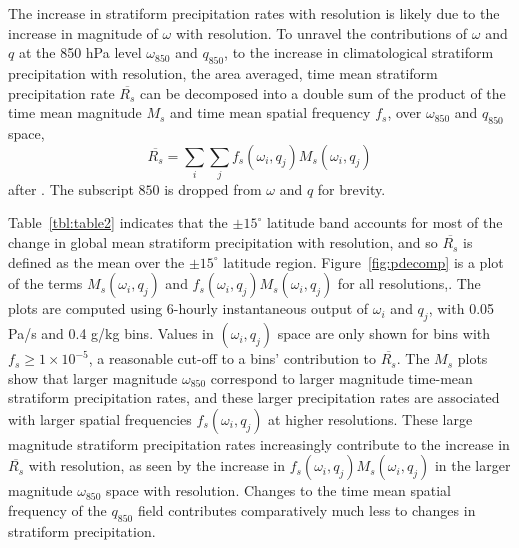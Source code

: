 \documentclass[times]{qjrms4}
\begin{document}
The increase in stratiform precipitation rates with resolution is likely due to the increase in magnitude of $\omega$ with resolution. To unravel the contributions of $\omega$ and $q$ at the 850 hPa level $\omega_{850}$ and $q_{850}$, to the increase in climatological stratiform precipitation with resolution, the area averaged, time mean stratiform precipitation rate $\overline{R_{s}}$ can be decomposed into a double sum of the product of the time mean magnitude $M_s$ and time mean spatial frequency $f_s$, over $\omega_{850}$ and $q_{850}$ space,
\begin{equation}
\overline{R_{s}} = \sum_i \sum_j f_s \left( \omega_i , q_j \right) M_s \left( \omega_i , q_j \right) \label{eq:pdecomp}
\end{equation}
after \cite{TETAL2018CD}. The subscript $850$ is dropped from $\omega$ and $q$ for brevity. 

Table~\ref{tbl:table2} indicates that the $\pm 15^{\circ}$ latitude band accounts for most of the change in global mean stratiform precipitation with resolution, and so $\overline{R_s}$ is defined as the mean over the $\pm 15^{\circ}$ latitude region. Figure~\ref{fig:pdecomp} is a plot of the terms $M_s \left( \omega_i , q_j \right)$ and $f_s \left( \omega_i , q_j \right) M_s \left( \omega_i , q_j \right)$ for all resolutions,. The plots are computed using 6-hourly instantaneous output of $\omega_{i}$ and $q_{j}$, with 0.05 Pa/s and 0.4 g/kg bins. Values in  $\left( \omega_{i} , q_{j} \right)$ space are only shown for bins with $f_s \geq1 \times 10^{-5}$, a reasonable cut-off to a bins' contribution to $\overline{R_s}$. The $M_s$ plots show that larger magnitude $\omega_{850}$ correspond to larger magnitude time-mean stratiform precipitation rates, and these larger precipitation rates are associated with larger spatial frequencies $f_s \left( \omega_i , q_j \right)$ at higher resolutions. These large magnitude stratiform precipitation rates increasingly contribute to the increase in $\overline{R_{s}}$ with resolution, as seen by the increase in $f_s \left( \omega_i , q_j \right) M_s \left( \omega_i , q_j \right)$ in the larger magnitude $\omega_{850}$ space with resolution. Changes to the time mean spatial frequency of the $q_{850}$ field contributes comparatively much less to changes in stratiform precipitation.
\end{document}

